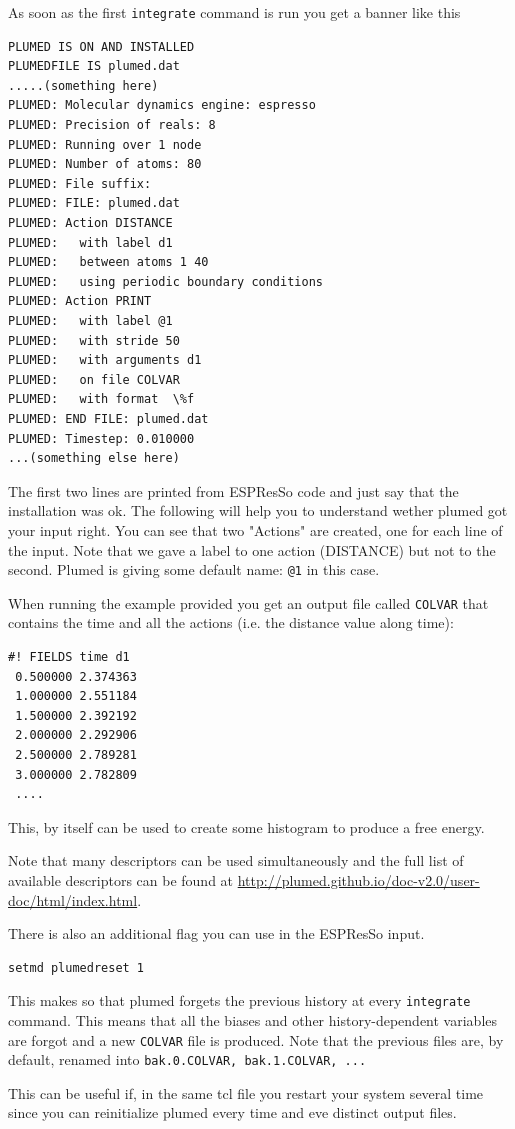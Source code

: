 \documentclass[10pt,fleqn,a4paper]{report}
\begin{document}
As soon as the first \texttt{integrate} command is run you get a banner like this
\begin{verbatim}
PLUMED IS ON AND INSTALLED
PLUMEDFILE IS plumed.dat
.....(something here)
PLUMED: Molecular dynamics engine: espresso
PLUMED: Precision of reals: 8
PLUMED: Running over 1 node
PLUMED: Number of atoms: 80
PLUMED: File suffix:
PLUMED: FILE: plumed.dat
PLUMED: Action DISTANCE
PLUMED:   with label d1
PLUMED:   between atoms 1 40
PLUMED:   using periodic boundary conditions
PLUMED: Action PRINT
PLUMED:   with label @1
PLUMED:   with stride 50
PLUMED:   with arguments d1
PLUMED:   on file COLVAR
PLUMED:   with format  \%f
PLUMED: END FILE: plumed.dat
PLUMED: Timestep: 0.010000
...(something else here)
\end{verbatim}
The first two lines are printed from ESPResSo code and just say that the installation was ok. 
The following will help you to understand wether plumed got your input right.
You can see that two "Actions" are created, one for each line of the input. Note that we gave a label to one action (DISTANCE) but not to the second. Plumed is giving some default name:  \texttt{@1} in this case.

When running the example provided you get an output file called \texttt{COLVAR} that contains the time and all the actions (i.e. the distance value along time):
\begin{verbatim}
#! FIELDS time d1
 0.500000 2.374363
 1.000000 2.551184
 1.500000 2.392192
 2.000000 2.292906
 2.500000 2.789281
 3.000000 2.782809
 ....
\end{verbatim}
This, by itself can be used to create some histogram to produce a free energy.

Note that many descriptors can be used simultaneously and 
the full list of available descriptors can be found at \url{http://plumed.github.io/doc-v2.0/user-doc/html/index.html}.

\vspace{1cm}
There is also an additional flag you can use in the ESPResSo input.
\begin{verbatim}
setmd plumedreset 1
\end{verbatim}
This makes so that plumed forgets the previous history at every \texttt{integrate} command. This means that all the biases and other history-dependent variables are forgot and a new \texttt{COLVAR} file is produced. Note that the previous files are, by default, renamed into \texttt{bak.0.COLVAR,  bak.1.COLVAR, ... }

 This can be useful if, in the same tcl file you restart your system several time since you can reinitialize plumed every time and eve distinct output files. 
\end{document}
